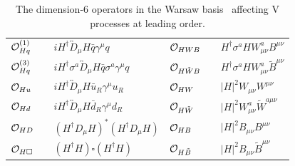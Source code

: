 \documentclass[a4paper,11pt]{article}
\renewcommand{\PV}{{{{V}}}\xspace}
\newcommand{\VH}{{{\PV}{\PH}}\xspace}
\begin{document}
\begin{table}[tph]
\caption{
The dimension-6 operators in the Warsaw basis~\cite{Grzadkowski:2010es} affecting \VH  processes at leading order.
}
\begin{center}
{\renewcommand{\arraystretch}{1.3}
\begin{tabular}{lcl|lcl}
${\cal O}^{(1)}_{Hq}$&&$i H^\dagger \overleftrightarrow{D}_\mu H \bar{q}   \gamma^\mu q$&${\cal O}_{HWB}$&&$ H^\dagger \sigma^a H W^a_{\mu\nu}B^{\mu\nu}$ \\
\rule{0pt}{4ex} ${\cal O}^{(3)}_{Hq}$&&$i H^\dagger \sigma^a \overleftrightarrow{D}_\mu H \bar{q}  \sigma^a \gamma^\mu q$ &${\cal O}_{H\tilde{W}B}$&&$ H^\dagger \sigma^a H W^a_{\mu\nu}\tilde{B}^{\mu\nu}$\\
\rule{0pt}{4ex} ${\cal O}_{Hu}$&&$i H^\dagger \overleftrightarrow{D}_\mu H \bar{u}_R  \gamma^\mu u_R$&${\cal O}_{H{W}}$&&$ |H|^2 W_{\mu\nu}{W}^{\mu\nu}$\\
\rule{0pt}{4ex} ${\cal O}_{Hd}$&&$i H^\dagger \overleftrightarrow{D}_\mu H \bar{d}_R  \gamma^\mu d_R$&${\cal O}_{H\tilde{W}}$&&$ |H|^2 W^a_{\mu\nu}\tilde{W}^{a \mu\nu}$\\
\rule{0pt}{4ex} ${\cal O}_{HD}$&&$(H^\dagger  {D}_\mu H)^*(H^\dagger  {D}_\mu H)$& ${\cal O}_{HB}$&&$|H|^2 B_{\mu\nu}B^{\mu\nu}$\\
\rule{0pt}{4ex} ${\cal O}_{H\square}$&&$(H^\dagger H) \square (H^\dagger H)$& ${\cal O}_{H\tilde{B}}$&&$|H|^2 B_{\mu\nu}\tilde{B}^{\mu\nu}$
\end{tabular}}
\label{Tab:Operators}
\end{center}
\end{table}
\end{document}
